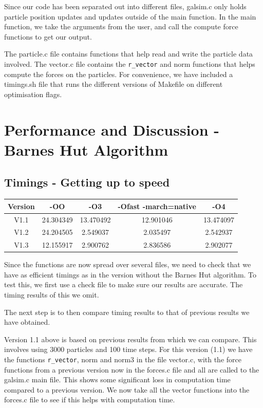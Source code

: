 \documentclass{article}
\begin{document}
Since our code has been separated out into different files, galsim.c only holds particle position updates and updates outside of the main function. In the main function, we take the arguments from the user, and call the compute force functions to get our output.\vspace{0.3cm}

The particle.c file contains functions that help read and write the particle data involved. The vector.c file contains the \verb|r_vector| and norm functions that helps compute the forces on the particles. For convenience, we have included a timings.sh file that runs the different versions of Makefile on different optimisation flags.
\newpage
\section{Performance and Discussion - Barnes Hut Algorithm}
\subsection{Timings - Getting up to speed}
\begin{center}
\begin{tabular}{|c|c|c|c|c|}
\hline
Version & -OO & -O3 & -Ofast -march=native & -O4\\
\hline
V1.1 & 24.304349 & 13.470492 & 12.901046 & 13.474097\\
V1.2 & 24.204505 & 2.549037 & 2.035497 & 2.542937\\
V1.3 & 12.155917 & 2.900762 & 2.836586 & 2.902077\\
\hline
\end{tabular}
\end{center}
Since the functions are now spread over several files, we need to check that we have as efficient timings as in the version without the Barnes Hut algorithm. To test this, we first use a check file to make sure our results are accurate. The timing results of this we omit.\vspace{0.3cm}

The next step is to then compare timing results to that of previous results we have obtained.\vspace{0.3cm}

Version 1.1 above is based on previous results from which we can compare. This involves using 3000 particles and 100 time steps. For this version (1.1) we have the functions \verb|r_vector|, norm and norm3 in the file vector.c, with the force functions from a previous version now in the forces.c file and all are called to the galsim.c main file. This shows some significant loss in computation time compared to a previous version. We now take all the vector functions into the forces.c file to see if this helps with computation time.\vspace{0.3cm}
\end{document}

